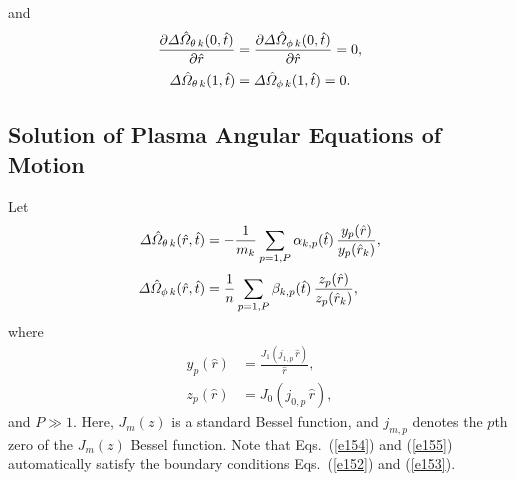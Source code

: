 \documentclass[notitlepage,12pt]{article}
\begin{document}
and
\begin{align}
\frac{\partial{\mit\Delta}{\hat{\mit\Omega}}_{\theta\,k}(0,\hat{t})}{\partial \hat{r}} &=
\frac{\partial{\mit\Delta}\hat{\mit\Omega}_{\phi\,k}(0,\hat{t})}{\partial \hat{r}} =0,\label{e152}\\[0.5ex]
{\mit\Delta}\hat{\mit\Omega}_{\theta\,k}(1,\hat{t})&={\mit\Delta}\hat{\mit\Omega}_{\phi\,k}(1,\hat{t})=0.\label{e153}
\end{align}

\subsection{Solution of Plasma Angular Equations of Motion}
Let
\begin{align}\label{e154}
{\mit\Delta}\hat{\mit\Omega}_{\theta\,k}(\hat{r},\hat{t})&=-\frac{1}{m_k}\sum_{p=1,P} \alpha_{k,p}(\hat{t})\,\frac{y_p(\hat{r})}{y_p(\hat{r}_k)},\\[0.5ex]
{\mit\Delta}\hat{\mit\Omega}_{\phi\,k}(\hat{r},\hat{t})&=\frac{1}{n}\sum_{p=1,P} \beta_{k,p}(\hat{t})\,\frac{z_p(\hat{r})}{z_p(\hat{r}_k)},\label{e155}
\end{align}
where
\begin{align}
y_p(\hat{r}) &=\frac{J_1(j_{1,p}\,\hat{r})}{\hat{r}},\\[0.5ex]
z_p(\hat{r}) &= J_0(j_{0,p}\,\hat{r}),\label{e158}
\end{align}
and $P\gg 1$. 
Here, $J_m(z)$ is a standard Bessel function, and $j_{m,p}$ denotes the $p$th zero of the $J_m(z)$ Bessel function. 
Note that  Eqs.~(\ref{e154}) and (\ref{e155}) automatically  satisfy the boundary conditions Eqs.~(\ref{e152}) and (\ref{e153}). 
\end{document}
